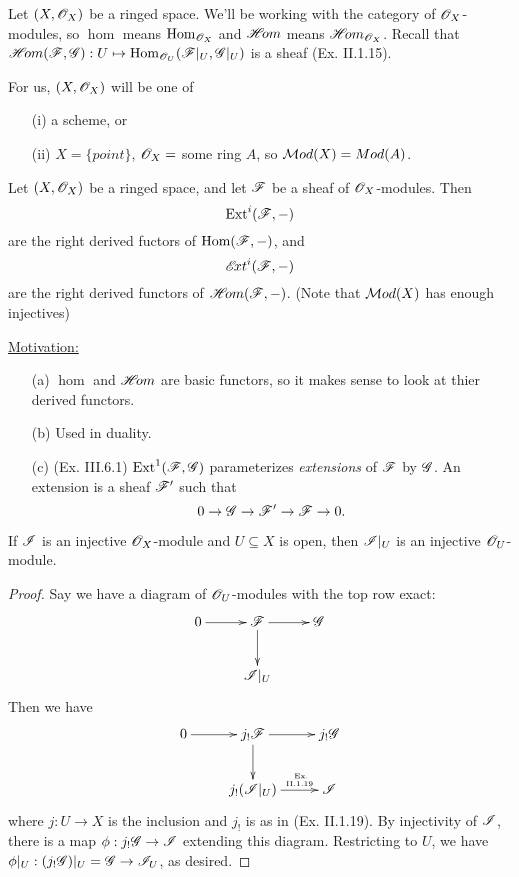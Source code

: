  \setcounter{lecture}{16}

 Let $(X,\mathscr{O}_X)$ be a ringed space.  We'll be working with the
 category of $\mathscr{O}_X$-modules, so $\hom$ means $\text{\rm Hom}_{\mathscr{O}_X}$ and
 $\mathscr{H}\!om$ means $\mathscr{H}\!om_{\mathscr{O}_X}$.  Recall that $\mathscr{H}\!om(\mathscr{F},\mathscr{G}):U\mapsto
 \text{\rm Hom}_{\mathscr{O}_U}(\mathscr{F}|_U,\mathscr{G}|_U)$ is a sheaf (Ex. II.1.15).

 For us, $(X,\mathscr{O}_X)$ will be one of
 \begin{itemize}
 \item[(i)] a scheme, or
 \item[(ii)] $X=\{point\}$, $\mathscr{O}_X=$ some ring $A$, so $\mathcal{M}od(X)=Mod(A)$.
 \end{itemize}

 \begin{definition}
 Let $(X,\mathscr{O}_X)$ be a ringed space, and let $\mathscr{F}$ be a sheaf of
 $\mathscr{O}_X$-modules.  Then \[\text{\rm Ext}^i(\mathscr{F},-)\] are the right derived
 fuctors of $\text{\rm Hom}(\mathscr{F},-)$, and \[\mathscr{E}\!xt^i(\mathscr{F},-)\] are the right
 derived functors of $\mathscr{H}\!om(\mathscr{F},-)$. (Note that $\mathcal{M}od(X)$ has enough
 injectives)
 \end{definition}

 \underline{Motivation:}
 \begin{itemize}
 \item[(a)] $\hom$ and $\mathscr{H}\!om$ are basic functors, so it makes sense to
 look at thier derived functors.
 \item[(b)] Used in duality.
 \item[(c)] (Ex. III.6.1) $\text{\rm Ext}^1(\mathscr{F},\mathscr{G})$ parameterizes \emph{extensions} of
 $\mathscr{F}$ by $\mathscr{G}$.  An extension is a sheaf $\mathscr{F}'$ such that
 \[
    0\to \mathscr{G}\to \mathscr{F}'\to \mathscr{F}\to 0.
 \]
 \end{itemize}

 \begin{lemma}
 If $\mathscr{I}$ is an injective $\mathscr{O}_X$-module and $U\subseteq X$ is open,
 then $\mathscr{I}|_U$ is an injective $\mathscr{O}_U$-module.
 \end{lemma}
 \begin{proof}
 Say we have a diagram of $\mathscr{O}_U$-modules with the top row exact:
 \[\xymatrix{
 0 \ar[r] & \F \ar[r] \ar[d] & \G\\ & \I|_U
 }\]
 Then we have
 \[\xymatrix{
 0 \ar[r] & j_!\F \ar[r] \ar[d] & j_!\G\\ & j_!(\I|_U)
 \ar[r]^-{\tiny \txt{ Ex.\\
 II.1.19}} & \I
 }\]
 where $j:U\to X$ is the inclusion and $j_!$ is as in (Ex.
 II.1.19).  By injectivity of $\mathscr{I}$, there is a map $\phi:j_!\mathscr{G} \to
 \mathscr{I}$ extending this diagram.  Restricting to $U$, we have
 $\phi|_U:(j_!\mathscr{G})|_U=\mathscr{G} \to \mathscr{I}_U$, as desired.
 \end{proof}

